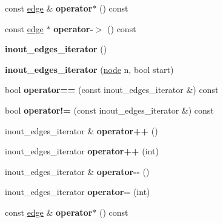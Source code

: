 \begin{DoxyCompactItemize}
\item 
\mbox{\label{classnode_a914c034c6f43029ad9b7f0826dd2614f}} 
const \mbox{\hyperlink{classedge}{edge}} \& {\bfseries operator$\ast$} () const
\item 
\mbox{\label{classnode_a71b168f27cc7338906814f6a3ecc176f}} 
const \mbox{\hyperlink{classedge}{edge}} $\ast$ {\bfseries operator-\/$>$} () const
\item 
\mbox{\label{classnode_a854d596611e6a3342090cce71cedf300}} 
{\bfseries inout\+\_\+edges\+\_\+iterator} ()
\item 
\mbox{\label{classnode_a2990a550ae39da89f6d18e6b5faf519e}} 
{\bfseries inout\+\_\+edges\+\_\+iterator} (\mbox{\hyperlink{classnode}{node}} n, bool start)
\item 
\mbox{\label{classnode_ae6b790b8b1dd9733be73b1d2c84716df}} 
bool {\bfseries operator==} (const inout\+\_\+edges\+\_\+iterator \&) const
\item 
\mbox{\label{classnode_ac4efb2e8423b3502f9d3a1bd6de80e73}} 
bool {\bfseries operator!=} (const inout\+\_\+edges\+\_\+iterator \&) const
\item 
\mbox{\label{classnode_a934fd5ac6865ae23f3b2758a573550ec}} 
inout\+\_\+edges\+\_\+iterator \& {\bfseries operator++} ()
\item 
\mbox{\label{classnode_a754f5fcf2ab3d5bf26e1e4fdc47cc766}} 
inout\+\_\+edges\+\_\+iterator {\bfseries operator++} (int)
\item 
\mbox{\label{classnode_a046088eba56244e29945d0197f6b642f}} 
inout\+\_\+edges\+\_\+iterator \& {\bfseries operator-\/-\/} ()
\item 
\mbox{\label{classnode_a9b906907ed01bb04c06bed300428da11}} 
inout\+\_\+edges\+\_\+iterator {\bfseries operator-\/-\/} (int)
\item 
\mbox{\label{classnode_a914c034c6f43029ad9b7f0826dd2614f}} 
const \mbox{\hyperlink{classedge}{edge}} \& {\bfseries operator$\ast$} () const
\item 

\end{DoxyCompactItemize}
